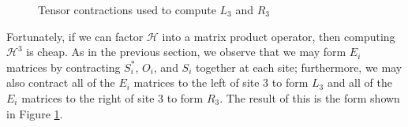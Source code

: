 \documentclass[12pt]{amsbook}
\theoremstyle{plain}
\theoremstyle{definition}
\theoremstyle{remark}
\begin{document}
\begin{figure}
\caption{Tensor contractions used to compute $L_3$ and $R_3$}
\label{fig:formation-of-LR}
\end{figure}

Fortunately, if we can factor $\mathscr{H}$ into a matrix product operator, then computing $\mathscr{H}^3$ is cheap.  As in the previous section, we observe that we may form $E_i$ matrices by contracting $S_i^*$, $O_i$, and $S_i$ together at each site;  furthermore, we may also contract all of the $E_i$ matrices to the left of site 3 to form $L_3$ and all of the $E_i$ matrices to the right of site 3 to form $R_3$.  The result of this is the form shown in Figure \ref{fig:formation-of-LR}.
\end{document}
